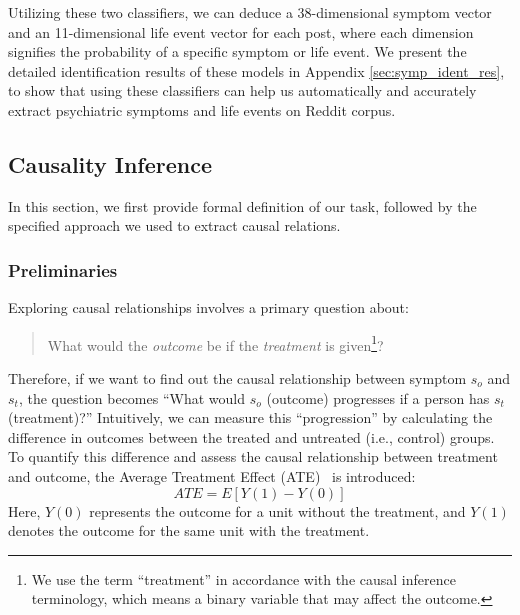 Utilizing these two classifiers, we can deduce a 38-dimensional symptom vector and an 11-dimensional life event vector for each post, where each dimension signifies the probability of a specific symptom or life event.
We present the detailed identification results of these models in Appendix \ref{sec:symp_ident_res}, to show that using these classifiers can help us automatically and accurately extract psychiatric symptoms and life events on Reddit corpus. 

\subsection{Causality Inference}
In this section, we first provide formal definition of our task, followed by the specified approach we used to extract causal relations. 
\label{sec:causalality_infer}
\subsubsection{Preliminaries} Exploring causal relationships involves a primary question about: 
\begin{quote}
    What would the \textit{outcome} be if the \textit{treatment} is given\footnote{We use the term ``treatment'' in accordance with the causal inference terminology, which means a binary variable that may affect the outcome.}?
\end{quote}
Therefore, if we want to find out the causal relationship between symptom $s_o$ and $s_t$, the question becomes ``What would $s_o$ (outcome) progresses if a person has $s_t$ (treatment)?'' Intuitively, we can measure this ``progression'' by calculating the difference in outcomes between the treated and untreated (i.e., control) groups. 
To quantify this difference and assess the causal relationship between treatment and outcome, the Average Treatment Effect (ATE)~\cite{Rosenbaum1983TheCR} is introduced:
\begin{equation}
    ATE = E[Y(1)-Y(0)]
\end{equation}
Here, $Y(0)$ represents the outcome for a unit without the treatment, and $Y(1)$ denotes the outcome for the same unit with the treatment.

